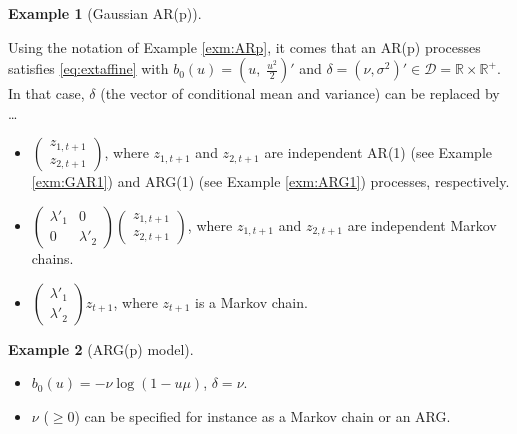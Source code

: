 \documentclass[
  12pt,
]{book}
\providecommand{\tightlist}{%
  \setlength{\itemsep}{0pt}\setlength{\parskip}{0pt}}
\theoremstyle{definition}
\theoremstyle{definition}
\newtheorem{example}{Example}[chapter]
\theoremstyle{definition}
\theoremstyle{definition}
\theoremstyle{remark}
\begin{document}
\begin{example}[Gaussian AR(p)]
\protect\hypertarget{exm:extendedARp}{}\label{exm:extendedARp}

Using the notation of Example \ref{exm:ARp}, it comes that an AR(p) processes satisfies \eqref{eq:extaffine} with \(b_0(u) = \left(u, \; \frac{u^2}{2}\right)'\) and \(\delta = (\nu,\sigma^2)' \in \mathcal{D}=\mathbb{R} \times \mathbb{R}^+\). In that case, \(\delta\) (the vector of conditional mean and variance) can be replaced by \ldots{}

\begin{itemize}
\tightlist
\item
  \(\left( \begin{array}{l} z_{1,t+1} \\ z_{2,t+1} \end{array} \right)\), where \(z_{1,t+1}\) and \(z_{2,t+1}\) are independent AR(1) (see Example \ref{exm:GAR1}) and ARG(1) (see Example \ref{exm:ARG1}) processes, respectively.
\item
  \(\left( \begin{array}{ll} \lambda'_1 & 0 \\ 0 & \lambda'_2 \end{array} \right)\)\(\left( \begin{array}{l} z_{1,t+1} \\ z_{2,t+1} \end{array} \right)\), where \(z_{1,t+1}\) and \(z_{2,t+1}\) are independent Markov chains.
\item
  \(\left( \begin{array}{l} \lambda'_1 \\ \lambda'_2 \end{array}\right)z_{t+1}\), where \(z_{t+1}\) is a Markov chain.
\end{itemize}

\end{example}

\begin{example}[ARG(p) model]
\protect\hypertarget{exm:ARGp}{}\label{exm:ARGp}\leavevmode

\begin{itemize}
\tightlist
\item
  \(b_0(u)= - \nu \log(1-u\mu)\), \(\delta=\nu\).
\item
  \(\nu\) (\(\ge 0\)) can be specified for instance as a Markov chain or an ARG.
\end{itemize}

\end{example}
\end{document}
